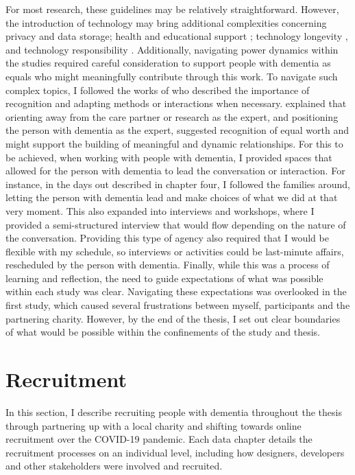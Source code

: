 For most research, these guidelines may be relatively straightforward. However, the introduction of technology may bring additional complexities concerning privacy and data storage; health and educational support \citep{gray2016inscribing}; technology longevity \citep{foley_printer_2019}, and technology responsibility \citep{ferrario_software_2014}. Additionally, navigating power dynamics within the studies required careful consideration to support people with dementia as equals who might meaningfully contribute through this work. To navigate such complex topics, I followed the works of \cite{nolan_beyond_2004,bartlett_personhood_2007,keady_involving_2007} who described the importance of recognition and adapting methods or interactions when necessary. \cite{nolan2002towards} explained that orienting away from the care partner or research as the expert, and positioning the person with dementia as the expert, suggested recognition of equal worth and might support the building of meaningful and dynamic relationships. For this to be achieved, when working with people with dementia, I provided spaces that allowed for the person with dementia to lead the conversation or interaction. For instance, in the days out described in chapter four, I followed the families around, letting the person with dementia lead and make choices of what we did at that very moment. This also expanded into interviews and workshops, where I provided a semi-structured interview that would flow depending on the nature of the conversation. Providing this type of agency also required that I would be flexible with my schedule, so interviews or activities could be last-minute affairs, rescheduled by the person with dementia. Finally, while this was a process of learning and reflection, the need to guide expectations of what was possible within each study was clear. Navigating these expectations was overlooked in the first study, which caused several frustrations between myself, participants and the partnering charity. However, by the end of the thesis, I set out clear boundaries of what would be possible within the confinements of the study and thesis.

\section{Recruitment}
\label{Method:Recruitment}
In this section, I describe recruiting people with dementia throughout the thesis through partnering up with a local charity and shifting towards online recruitment over the COVID-19 pandemic. Each data chapter details the recruitment processes on an individual level, including how designers, developers and other stakeholders were involved and recruited.

